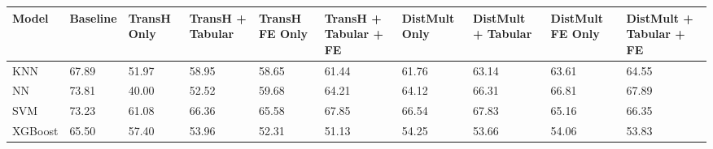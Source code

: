 \begin{tabular}{llllllllll}
\toprule
Model & Baseline & TransH Only & TransH + Tabular & TransH FE Only & TransH + Tabular + FE & DistMult Only & DistMult + Tabular & DistMult FE Only & DistMult + Tabular + FE \\
\midrule
KNN & 67.89 & 51.97 & 58.95 & 58.65 & 61.44 & 61.76 & 63.14 & 63.61 & 64.55 \\
NN & 73.81 & 40.00 & 52.52 & 59.68 & 64.21 & 64.12 & 66.31 & 66.81 & 67.89 \\
SVM & 73.23 & 61.08 & 66.36 & 65.58 & 67.85 & 66.54 & 67.83 & 65.16 & 66.35 \\
XGBoost & 65.50 & 57.40 & 53.96 & 52.31 & 51.13 & 54.25 & 53.66 & 54.06 & 53.83 \\
\bottomrule
\end{tabular}
